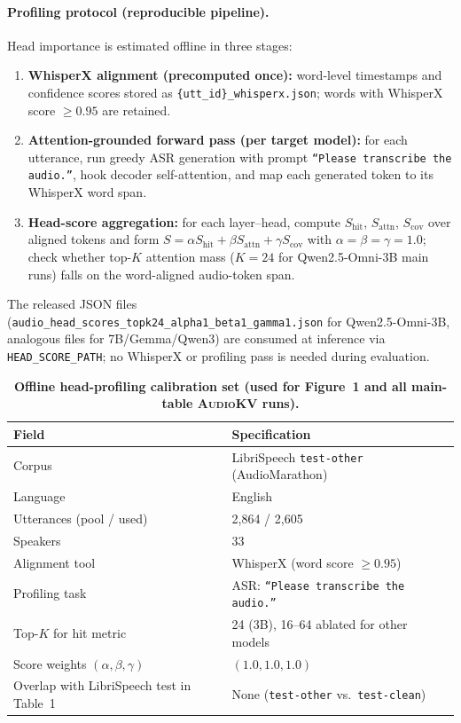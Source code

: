 \paragraph{Profiling protocol (reproducible pipeline).}
Head importance is estimated offline in three stages:
\begin{enumerate}
    \item \textbf{WhisperX alignment (precomputed once):} word-level timestamps and confidence scores stored as \texttt{\{utt\_id\}\_whisperx.json}; words with WhisperX score $\ge 0.95$ are retained.
    \item \textbf{Attention-grounded forward pass (per target model):} for each utterance, run greedy ASR generation with prompt \texttt{``Please transcribe the audio.''}, hook decoder self-attention, and map each generated token to its WhisperX word span.
    \item \textbf{Head-score aggregation:} for each layer--head, compute
    $S_{\text{hit}}$, $S_{\text{attn}}$, $S_{\text{cov}}$ over aligned tokens and form
    $S = \alpha S_{\text{hit}} + \beta S_{\text{attn}} + \gamma S_{\text{cov}}$
    with $\alpha=\beta=\gamma=1.0$; check whether top-$K$ attention mass ($K{=}24$ for Qwen2.5-Omni-3B main runs) falls on the word-aligned audio-token span.
\end{enumerate}
The released JSON files (\texttt{audio\_head\_scores\_topk24\_alpha1\_beta1\_gamma1.json} for Qwen2.5-Omni-3B, analogous files for 7B/Gemma/Qwen3) are consumed at inference via \texttt{HEAD\_SCORE\_PATH}; no WhisperX or profiling pass is needed during evaluation.

\begin{table}[t]
\centering
\small
\setlength{\tabcolsep}{5pt}
\caption{\textbf{Offline head-profiling calibration set (used for Figure~1 and all main-table \textsc{AudioKV} runs).}}
\label{tab:rebuttal-head-profiling-corpus}
\begin{tabular}{ll}
\toprule
\textbf{Field} & \textbf{Specification} \\
\midrule
Corpus & LibriSpeech \texttt{test-other} (AudioMarathon) \\
Language & English \\
Utterances (pool / used) & 2{,}864 / 2{,}605 \\
Speakers & 33 \\
Alignment tool & WhisperX (word score $\ge 0.95$) \\
Profiling task & ASR: \texttt{``Please transcribe the audio.''} \\
Top-$K$ for hit metric & 24 (3B), 16--64 ablated for other models \\
Score weights $(\alpha,\beta,\gamma)$ & $(1.0, 1.0, 1.0)$ \\
Overlap with LibriSpeech test in Table~1 & None (\texttt{test-other} vs.\ \texttt{test-clean}) \\
\bottomrule
\end{tabular}
\end{table}

